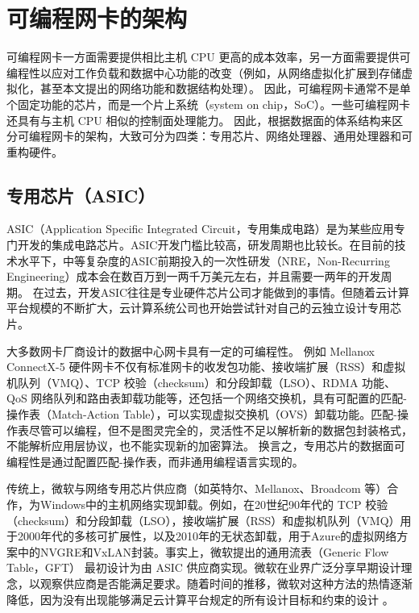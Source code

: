 \fi

\section{可编程网卡的架构}
\label{smartnic-architecture}

可编程网卡一方面需要提供相比主机 CPU 更高的成本效率，另一方面需要提供可编程性以应对工作负载和数据中心功能的改变（例如，从网络虚拟化扩展到存储虚拟化，甚至本文提出的网络功能和数据结构处理）。
因此，可编程网卡通常不是单个固定功能的芯片，而是一个片上系统（system on chip，SoC）。一些可编程网卡还具有与主机 CPU 相似的控制面处理能力。
因此，根据数据面的体系结构来区分可编程网卡的架构，大致可分为四类：专用芯片、网络处理器、通用处理器和可重构硬件。

\subsection{专用芯片（ASIC）}
\label{smartnic-asic}


ASIC（Application Specific Integrated Circuit，专用集成电路）是为某些应用专门开发的集成电路芯片。ASIC开发门槛比较高，研发周期也比较长。在目前的技术水平下，中等复杂度的ASIC前期投入的一次性研发（NRE，Non-Recurring Engineering）成本会在数百万到一两千万美元左右，并且需要一两年的开发周期。
在过去，开发ASIC往往是专业硬件芯片公司才能做到的事情。但随着云计算平台规模的不断扩大，云计算系统公司也开始尝试针对自己的云独立设计专用芯片。

大多数网卡厂商设计的数据中心网卡具有一定的可编程性。
例如 Mellanox ConnectX-5 \cite{mellanox-connectx-5} 硬件网卡不仅有标准网卡的收发包功能、接收端扩展（RSS）和虚拟机队列（VMQ）、TCP 校验（checksum）和分段卸载（LSO）、RDMA 功能、QoS 网络队列和路由表卸载功能等，还包括一个网络交换机，具有可配置的匹配-操作表（Match-Action Table），可以实现虚拟交换机（OVS）卸载功能。匹配-操作表尽管可以编程，但不是图灵完全的，灵活性不足以解析新的数据包封装格式，不能解析应用层协议，也不能实现新的加密算法。
换言之，专用芯片的数据面可编程性是通过配置匹配-操作表，而非通用编程语言实现的。


传统上，微软与网络专用芯片供应商（如英特尔、Mellanox、Broadcom 等）合作，为Windows中的主机网络实现卸载。例如，在20世纪90年代的 TCP 校验（checksum）和分段卸载（LSO），接收端扩展（RSS）和虚拟机队列（VMQ）用于2000年代的多核可扩展性，以及2010年的无状态卸载，用于Azure的虚拟网络方案中的NVGRE和VxLAN封装。事实上，微软提出的通用流表（Generic Flow Table，GFT） \cite{firestone2017vfp} 最初设计为由 ASIC 供应商实现。微软在业界广泛分享早期设计理念，以观察供应商是否能满足要求。随着时间的推移，微软对这种方法的热情逐渐降低，因为没有出现能够满足云计算平台规定的所有设计目标和约束的设计 \cite{smartnic}。


